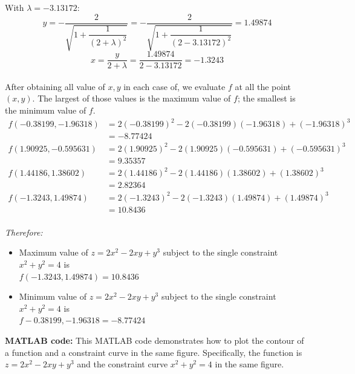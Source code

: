 With $\lambda =-3.13172$: 
$$ y = -\dfrac{2}{ \sqrt{1 + \dfrac{1}{(2 + \lambda)^2}} } = -\dfrac{2}{ \sqrt{1 + \dfrac{1}{(2 -3.13172)^2}} } = 1.49874$$
$$ x = \dfrac{y}{2 + \lambda} = \dfrac{1.49874}{2 -3.13172} = -1.3243 $$\\[6pt]

After obtaining all value of $x, y$ in each case of, we evaluate $f$ at all the point $(x,y)$. The largest of those values is the maximum value of $f$; the smallest is the minimum value of $f$.
\begin{align*}
  f(-0.38199,-1.96318)
    &=2(-0.38199)^2-2(-0.38199)(-1.96318)+(-1.96318)^3\\
    &=-8.77424\\[6pt]
  f(1.90925,-0.595631)
    &=2(1.90925)^2-2(1.90925)(-0.595631)+(-0.595631)^3\\
    &=9.35357\\[6pt]
  f(1.44186,1.38602)
    &=2(1.44186 )^2-2(1.44186 )(1.38602)+(1.38602)^3\\
    &=2.82364\\[6pt]
  f(-1.3243,1.49874)
    &=2(-1.3243 )^2-2(-1.3243 )(1.49874)+(1.49874)^3\\
    &=10.8436\\[6pt]
\end{align*}

\textit{Therefore: }
\begin{itemize}
  \item Maximum value of $z = 2x^2 - 2xy + y^3$ subject to the single constraint $x^2 + y^2 = 4$ is \\
        $f(-1.3243,1.49874) = 10.8436$
  \item Minimum value of $z = 2x^2 - 2xy + y^3$ subject to the single constraint $x^2 + y^2 = 4$ is \\
        $f-0.38199,-1.96318=-8.77424$
\end{itemize}

\vspace*{1cm}

\textbf{MATLAB code: }
This MATLAB code demonstrates how to plot the contour of a function and a constraint curve in the same figure. Specifically, the function is $z = 2x^2-2xy+y^3$ and the constraint curve $x^2 + y^2 = 4$ in the same figure.

